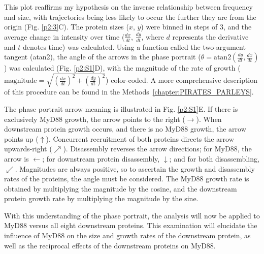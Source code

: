This plot reaffirms my hypothesis on the inverse relationship between frequency and size, with trajectories being less likely to occur the further they are from the origin (Fig. \ref{p2:3}C). The protein sizes ($x$, $y$) were binned in steps of 3\times, and the average change in intensity over time ($\frac{dx}{dt}$, $\frac{dy}{dt}$, where $d$ represents the derivative and $t$ denotes time) was calculated. Using a function called the two-argument tangent (atan2), the angle of the arrows in the phase portrait ($\theta = \text{atan2}(\frac{dy}{dt}, \frac{dx}{dt})$) was calculated (Fig. \ref{p2:S1}D), with the magnitude of the rate of growth ($\text{magnitude} = \sqrt{(\frac{dx}{dt})^2 + (\frac{dy}{dt})^2}$) color-coded. A more comprehensive description of this procedure can be found in the Methods~\ref{chapter:PIRATES_PARLEYS}.

The phase portrait arrow meaning is illustrated in Fig. \ref{p2:S1}E. If there is exclusively MyD88 growth, the arrow points to the right ($\rightarrow$). When downstream protein growth occurs, and there is no MyD88 growth, the arrow points up ($\uparrow$). Concurrent recruitment of both proteins directs the arrow upwards-right ($\nearrow$). Disassembly reverses the arrow directions; for MyD88, the arrow is $\leftarrow$; for downstream protein disassembly, $\downarrow$; and for both disassembling, $\swarrow$. Magnitudes are always positive, so to ascertain the growth and disassembly rates of the proteins, the angle must be considered. The MyD88 growth rate is obtained by multiplying the magnitude by the cosine, and the downstream protein growth rate by multiplying the magnitude by the sine.

With this understanding of the phase portrait, the analysis will now be applied to MyD88 versus all eight downstream proteins. This examination will elucidate the influence of MyD88 on the size and growth rates of the downstream protein, as well as the reciprocal effects of the downstream proteins on MyD88.


